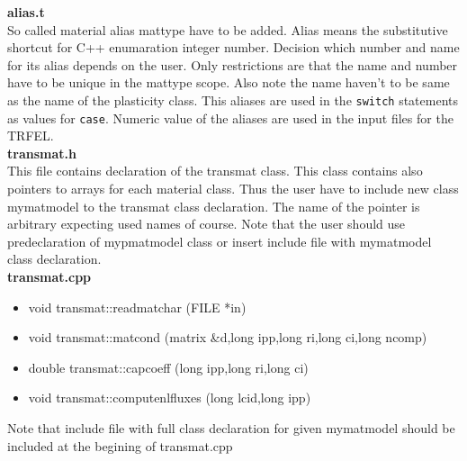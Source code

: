{\bf alias.t}\\
So called material alias {\sf mattype} have to be added. Alias means the substitutive shortcut
for C++ enumaration integer number. Decision which number and name for its alias depends on the user.
Only restrictions are that the name and number have to be unique in the {\sf mattype} scope. Also note
the name haven't to be same as the name of the plasticity class. This aliases are used in the
{\tt switch} statements as values for {\tt case}. Numeric value of the aliases are used in the input
files for the TRFEL.\\

{\bf transmat.h}\\
This file contains declaration of the {\sf transmat} class. This class contains also pointers to arrays for each
material class. Thus the user have to include new class {\sf mymatmodel} to the {\sf transmat} class declaration.
The name of the pointer is arbitrary expecting used names of course. Note that the user should use predeclaration
of {\sf mypmatmodel} class or insert include file with {\sf mymatmodel} class declaration.\\

{\bf transmat.cpp}\\
\begin{itemize}
\item {\sf void transmat::readmatchar (FILE *in)}
\item {\sf void transmat::matcond (matrix \&d,long ipp,long ri,long ci,long ncomp)}
\item {\sf double transmat::capcoeff (long ipp,long ri,long ci)}
\item {\sf void transmat::computenlfluxes (long lcid,long ipp)}
\end{itemize}
Note that include file with full class declaration for given {\sf mymatmodel} should be included at the begining
of transmat.cpp\\

